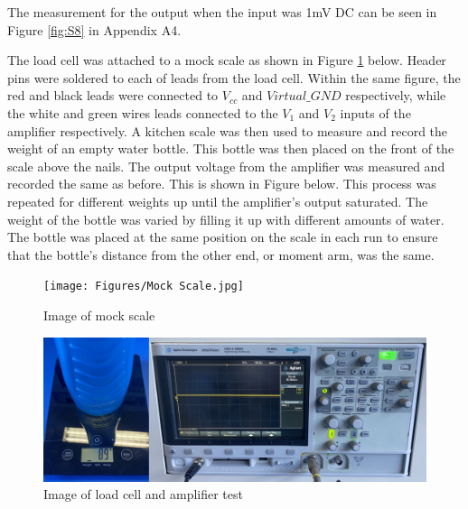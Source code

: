 \documentclass[class=report,11pt,crop=false]{standalone}
\begin{document}
	The measurement for the output when the input was 1mV DC can be seen in Figure \ref{fig:S8} in Appendix A4.
	
	The load cell was attached to a mock scale as shown in Figure \ref{fig:S9} below. Header pins were soldered to each of leads from the load cell. Within the same figure, the red and black leads were connected to $V_{cc}$ and $Virtual\_GND$ respectively, while the white and green wires leads connected to the $V_1$ and $V_2$ inputs of the amplifier respectively. A kitchen scale was then used to measure and record the weight of an empty water bottle. This bottle was then placed on the front of the scale above the nails. The output voltage from the amplifier was measured and recorded the same as before. This is shown in Figure below. This process was repeated for different weights up until the amplifier's output saturated. The weight of the bottle was varied by filling it up with different amounts of water. The bottle was placed at the same position on the scale in each run to ensure that the bottle's distance from the other end, or moment arm, was the same. 
	\begin{figure}[h!]
		\centering
		\texttt{[image: Figures/Mock Scale.jpg]}
		\caption{Image of mock scale}
		\label{fig:S9}
	\end{figure}
	
	\begin{figure}[h!]
		\centering
		\includegraphics[width=0.8\linewidth]{Figures/ATP3.jpg}
		\caption{Image of load cell and amplifier test}
		\label{fig:S10}
	\end{figure}
	
\end{document}
